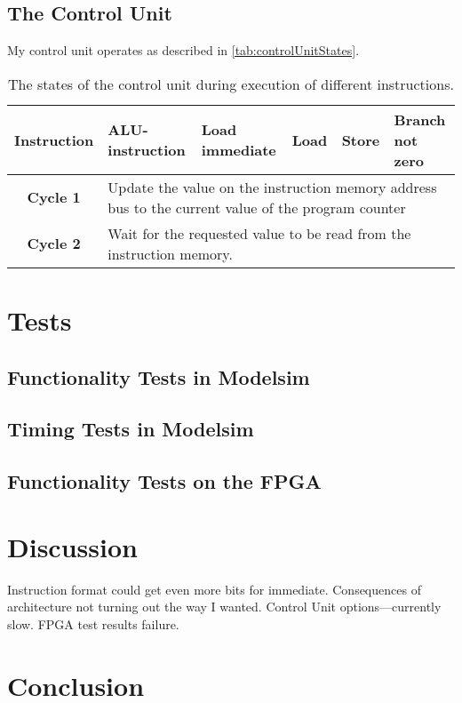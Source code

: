 \documentclass[11pt]{article}
\begin{document}
\subsection{The Control Unit}
\label{subsec:controlunit}
My control unit operates as described in \autoref{tab:controlUnitStates}.
\begin{table}[htbp]
  \centering
  \begin{tabular}{|c|p{}|p{40pt}|p{40pt}|p{40pt}|p{40pt}|}
    \hline
    {\bf Instruction} & ALU-instruction & Load immediate & Load & Store & Branch not zero \\ \hline
    {\bf Cycle 1} & \multicolumn{5}{|p{200pt}|}{Update the value on the instruction memory address bus to the current value of the program counter} \\ \hline
    {\bf Cycle 2} & \multicolumn{5}{|p{200pt}|}{Wait for the requested value to be read from the instruction memory.} \\ \hline
  \end{tabular}
  \caption{The states of the control unit during execution of different instructions.}
  \label{tab:controlUnitStates}
\end{table}


\section{Tests}
\label{sec:tests}

\subsection{Functionality Tests in Modelsim}
\label{subsec:functestsim}

\subsection{Timing Tests in Modelsim}
\label{subsec:timingtestsim}

\subsection{Functionality Tests on the FPGA}
\label{subsec:functestfpga}



\section{Discussion}
\label{sec:discussion}

Instruction format could get even more bits for immediate. 
Consequences of architecture not turning out the way I wanted.
Control Unit options---currently slow. 
FPGA test results failure.


\section{Conclusion}
\label{sec:conclusion}




\end{document}

